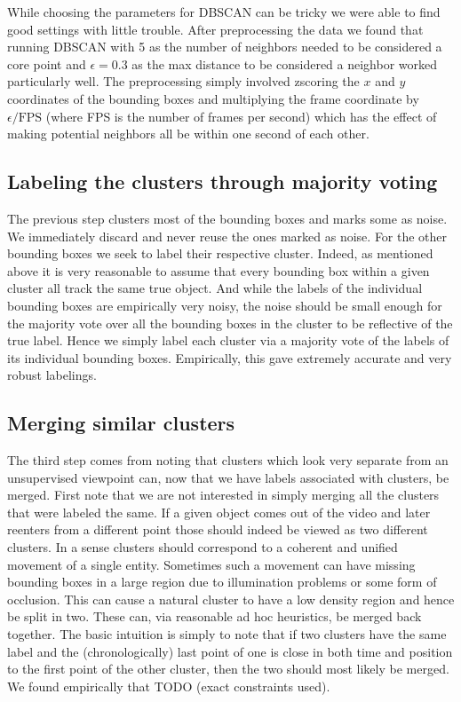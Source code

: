 \documentclass{article}
\begin{document}
While choosing the parameters for DBSCAN can be tricky we were able to find good settings with little trouble. 
After preprocessing the data we found that running DBSCAN with 5 as the number of neighbors needed to be considered a core point and $\epsilon=0.3$ as 
the max distance to be considered a neighbor worked particularly well. The preprocessing simply involved zscoring the $x$ and $y$ coordinates of the bounding boxes
and multiplying the frame coordinate by $\epsilon / \text{FPS}$ (where FPS is the number of frames per second) which has the effect of making potential neighbors all be within one 
second of each other.

\subsection{Labeling the clusters through majority voting}

The previous step clusters most of the bounding boxes and marks some as noise. We immediately discard and never reuse the ones marked as noise. For the other bounding boxes we seek to label their respective
cluster. Indeed, as mentioned above it is very reasonable to assume that every bounding box within a given cluster all track the same true object. And while the labels of the individual bounding boxes 
are empirically very noisy, the noise should be small enough for the majority vote over all the bounding boxes in the cluster to be reflective of the true label. Hence we simply label each cluster
via a majority vote of the labels of its individual bounding boxes. Empirically, this gave extremely accurate and very robust labelings.

\subsection{Merging similar clusters}

The third step comes from noting that clusters which look very separate from an unsupervised viewpoint can, now that we have labels associated with clusters, be merged. First note that we are not interested
in simply merging all the clusters that were labeled the same. If a given object comes out of the video and later reenters from a different point those should indeed be viewed as two different clusters. 
In a sense clusters should correspond to a coherent and unified movement of a single entity. Sometimes such a movement can have missing bounding boxes in a large region due to illumination problems or 
some form of occlusion. This can cause a natural cluster to have a low density region and hence be split in two. These can, via reasonable ad hoc heuristics, be merged back together. The basic intuition
is simply to note that if two clusters have the same label and the (chronologically) last point of one is close in both time and position to the first point of the other cluster, then the two should 
most likely be merged. We found empirically that TODO (exact constraints used).
\end{document}
